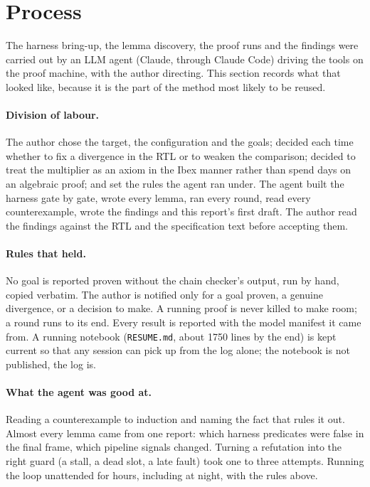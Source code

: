 \documentclass[11pt]{article}
\newcommand{\code}[1]{\texttt{#1}}
\begin{document}
\section{Process}
\label{sec:process}

The harness bring-up, the lemma discovery, the proof runs and the findings were
carried out by an LLM agent (Claude, through Claude Code) driving the tools on
the proof machine, with the author directing. This section records what that
looked like, because it is the part of the method most likely to be reused.

\paragraph{Division of labour.}
The author chose the target, the configuration and the goals; decided each
time whether to fix a divergence in the RTL or to weaken the comparison;
decided to treat the multiplier as an axiom in the Ibex manner rather than
spend days on an algebraic proof; and set the rules the agent ran under. The
agent built the harness gate by gate, wrote every lemma, ran every round, read
every counterexample, wrote the findings and this report's first draft. The
author read the findings against the RTL and the specification text before
accepting them.

\paragraph{Rules that held.}
No goal is reported proven without the chain checker's output, run by hand,
copied verbatim. The author is notified only for a goal proven, a genuine
divergence, or a decision to make. A running proof is never killed to make
room; a round runs to its end. Every result is reported with the model
manifest it came from. A running notebook (\code{RESUME.md}, about 1750
lines by the end) is kept current so that any session can pick up from the
log alone; the notebook is not published, the log is.

\paragraph{What the agent was good at.}
Reading a counterexample to induction and naming the fact that rules it out.
Almost every lemma came from one report: which harness predicates were false
in the final frame, which pipeline signals changed. Turning a refutation into
the right guard (a stall, a dead slot, a late fault) took one to three
attempts. Running the loop unattended for hours, including at night, with the
rules above.
\end{document}
